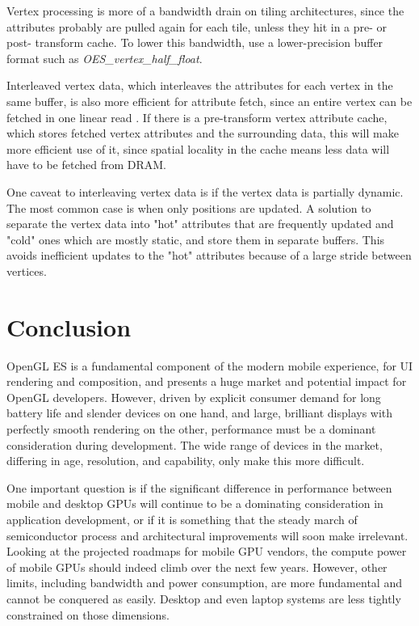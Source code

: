 Vertex processing is more of a bandwidth drain on tiling architectures, since
the attributes probably are pulled again for each tile, unless they hit in a
pre- or post- transform cache.  To lower this bandwidth, use a lower-precision
buffer format such as \textit{OES\_vertex\_half\_float}.

Interleaved vertex
 data, which interleaves the attributes for each vertex in
the same buffer, is
 also more efficient for attribute fetch, since an entire
vertex can be fetched
 in one linear read \cite{Apple11}.  If there is a
pre-transform vertex
 attribute cache, which stores fetched vertex attributes
and the surrounding
 data, this will make more efficient use of it, since
spatial locality in the
 cache means less data will have to be fetched from
DRAM.

One caveat to interleaving vertex data is if the vertex data is partially
dynamic.  The most common case is when only positions are updated.  A solution
to separate the vertex data into "hot" attributes that are frequently updated
and "cold" ones which are mostly static, and store them in separate buffers.
This avoids inefficient updates to the "hot" attributes because of a large
stride between vertices.

\section{Conclusion}\label{Jon-McCaffrey-Conclusion}

OpenGL ES is a fundamental component of the modern mobile experience, for UI
rendering and composition, \cite{Guy11} and presents a huge market and
potential impact for OpenGL developers.  However, driven by explicit consumer
demand for long battery life and slender devices on one hand, and large,
brilliant displays with perfectly smooth rendering on the other, performance
must be a dominant consideration during development.  The wide range of devices
in the market, differing in age, resolution, and capability, only make
this more difficult.

One important question is if the significant difference in performance
between
 mobile and desktop GPUs will continue to be a dominating
consideration in application development, or if
 it is something that the
steady march of semiconductor process and
 architectural improvements will
soon make irrelevant.  Looking at the projected
 roadmaps for mobile GPU
vendors, the compute power of mobile GPUs should indeed
 climb over the next
few years.  However, other limits, including bandwidth and
 power consumption,
are more fundamental and cannot be conquered as easily.  Desktop and even
laptop systems are less tightly constrained on those dimensions.

